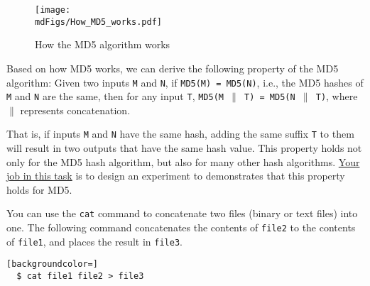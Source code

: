 \begin{figure}[htb]
	\centering
	\texttt{[image: \\mdFigs/How\_MD5\_works.pdf]}
	\caption{How the MD5 algorithm works}
	\label{md5:fig:how_md5_works}
\end{figure}


Based on how MD5 works, we can derive the following property of the MD5 algorithm: 
Given two inputs \texttt{M} and \texttt{N}, if \texttt{MD5(M) = MD5(N)}, i.e.,
the MD5 hashes of \texttt{M} and \texttt{N} are the same,
then for any input \texttt{T}, \texttt{MD5(M $\|$ T) = MD5(N $\|$ T)}, 
where \texttt{$\|$} represents concatenation.  

That is, if inputs \texttt{M} and \texttt{N} have the same hash, adding
the same suffix \texttt{T} to them will result in two
outputs that have the same hash value. 
This property holds not only for the MD5 hash algorithm, but also for many other hash
algorithms. \underline{Your job in this task} is to design an experiment to demonstrates
that this property holds for MD5.  


You can use the \texttt{cat} command to concatenate two files (binary or text files)
into one. The following command concatenates the contents of
\texttt{file2} to the contents of \texttt{file1}, and places the result in
\texttt{file3}.  


\begin{lstlisting}[backgroundcolor=]
  $ cat file1 file2 > file3
\end{lstlisting}
 





